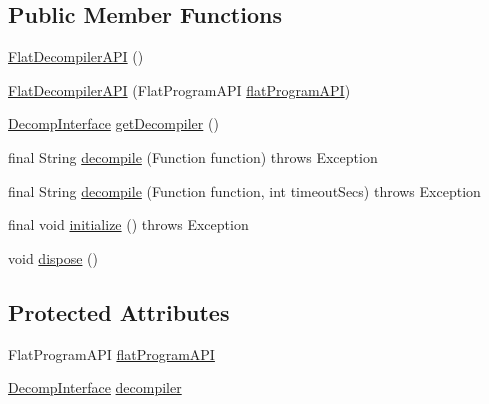 \subsection*{Public Member Functions}
\begin{DoxyCompactItemize}
\item 
\mbox{\hyperlink{classghidra_1_1app_1_1decompiler_1_1flatapi_1_1_flat_decompiler_a_p_i_a250f8ebdea08b3892e781e505efa56fb}{Flat\+Decompiler\+A\+PI}} ()
\item 
\mbox{\hyperlink{classghidra_1_1app_1_1decompiler_1_1flatapi_1_1_flat_decompiler_a_p_i_a0c3f369ca9fc3e7424cfab3694e30aae}{Flat\+Decompiler\+A\+PI}} (Flat\+Program\+A\+PI \mbox{\hyperlink{classghidra_1_1app_1_1decompiler_1_1flatapi_1_1_flat_decompiler_a_p_i_ad3d370c5dfc4c684a11c360595f9b15b}{flat\+Program\+A\+PI}})
\item 
\mbox{\hyperlink{classghidra_1_1app_1_1decompiler_1_1_decomp_interface}{Decomp\+Interface}} \mbox{\hyperlink{classghidra_1_1app_1_1decompiler_1_1flatapi_1_1_flat_decompiler_a_p_i_a7cb290f22a0515a68723ad84673e385e}{get\+Decompiler}} ()
\item 
final String \mbox{\hyperlink{classghidra_1_1app_1_1decompiler_1_1flatapi_1_1_flat_decompiler_a_p_i_aa8f1363ab1b6837f3840f4d342f639a4}{decompile}} (Function function)  throws Exception 
\item 
final String \mbox{\hyperlink{classghidra_1_1app_1_1decompiler_1_1flatapi_1_1_flat_decompiler_a_p_i_a83e63ba2faea29732064cee33edab094}{decompile}} (Function function, int timeout\+Secs)  throws Exception 
\item 
final void \mbox{\hyperlink{classghidra_1_1app_1_1decompiler_1_1flatapi_1_1_flat_decompiler_a_p_i_af9bcfa6f53c58142ecd498dd1151a31d}{initialize}} ()  throws Exception 
\item 
void \mbox{\hyperlink{classghidra_1_1app_1_1decompiler_1_1flatapi_1_1_flat_decompiler_a_p_i_af23bd29dc1cf1a2b95683c2ac34340ef}{dispose}} ()
\end{DoxyCompactItemize}
\subsection*{Protected Attributes}
\begin{DoxyCompactItemize}
\item 
Flat\+Program\+A\+PI \mbox{\hyperlink{classghidra_1_1app_1_1decompiler_1_1flatapi_1_1_flat_decompiler_a_p_i_ad3d370c5dfc4c684a11c360595f9b15b}{flat\+Program\+A\+PI}}
\item 
\mbox{\hyperlink{classghidra_1_1app_1_1decompiler_1_1_decomp_interface}{Decomp\+Interface}} \mbox{\hyperlink{classghidra_1_1app_1_1decompiler_1_1flatapi_1_1_flat_decompiler_a_p_i_a6ba7c5f405fc16d12abe7b6714a01fb3}{decompiler}}
\end{DoxyCompactItemize}


